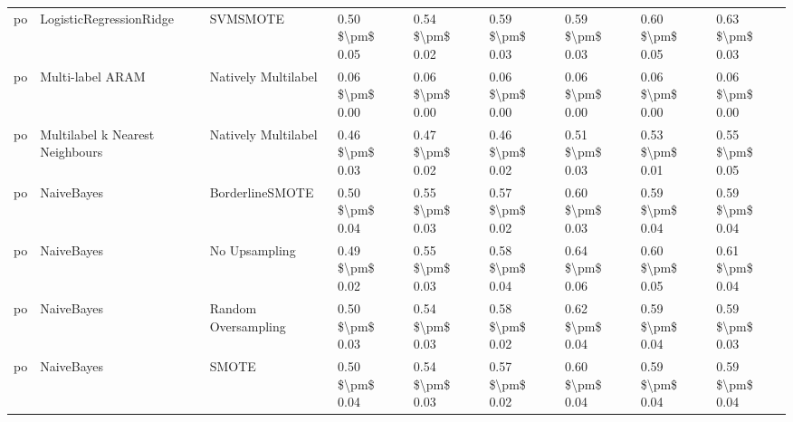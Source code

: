 \begin{tabular}{lllllllll}
      po &         LogisticRegressionRidge &                      SVMSMOTE & 0.50 \$\textbackslash pm\$ 0.05 &           0.54 \$\textbackslash pm\$ 0.02 &       0.59 \$\textbackslash pm\$ 0.03 &        0.59 \$\textbackslash pm\$ 0.03 &                         0.60 \$\textbackslash pm\$ 0.05 &     0.63 \$\textbackslash pm\$ 0.03 \\
      po &                Multi-label ARAM &           Natively Multilabel & 0.06 \$\textbackslash pm\$ 0.00 &           0.06 \$\textbackslash pm\$ 0.00 &       0.06 \$\textbackslash pm\$ 0.00 &        0.06 \$\textbackslash pm\$ 0.00 &                         0.06 \$\textbackslash pm\$ 0.00 &     0.06 \$\textbackslash pm\$ 0.00 \\
      po & Multilabel k Nearest Neighbours &           Natively Multilabel & 0.46 \$\textbackslash pm\$ 0.03 &           0.47 \$\textbackslash pm\$ 0.02 &       0.46 \$\textbackslash pm\$ 0.02 &        0.51 \$\textbackslash pm\$ 0.03 &                         0.53 \$\textbackslash pm\$ 0.01 &     0.55 \$\textbackslash pm\$ 0.05 \\
      po &                      NaiveBayes &               BorderlineSMOTE & 0.50 \$\textbackslash pm\$ 0.04 &           0.55 \$\textbackslash pm\$ 0.03 &       0.57 \$\textbackslash pm\$ 0.02 &        0.60 \$\textbackslash pm\$ 0.03 &                         0.59 \$\textbackslash pm\$ 0.04 &     0.59 \$\textbackslash pm\$ 0.04 \\
      po &                      NaiveBayes &                 No Upsampling & 0.49 \$\textbackslash pm\$ 0.02 &           0.55 \$\textbackslash pm\$ 0.03 &       0.58 \$\textbackslash pm\$ 0.04 &        0.64 \$\textbackslash pm\$ 0.06 &                         0.60 \$\textbackslash pm\$ 0.05 &     0.61 \$\textbackslash pm\$ 0.04 \\
      po &                      NaiveBayes &           Random Oversampling & 0.50 \$\textbackslash pm\$ 0.03 &           0.54 \$\textbackslash pm\$ 0.03 &       0.58 \$\textbackslash pm\$ 0.02 &        0.62 \$\textbackslash pm\$ 0.04 &                         0.59 \$\textbackslash pm\$ 0.04 &     0.59 \$\textbackslash pm\$ 0.03 \\
      po &                      NaiveBayes &                         SMOTE & 0.50 \$\textbackslash pm\$ 0.04 &           0.54 \$\textbackslash pm\$ 0.03 &       0.57 \$\textbackslash pm\$ 0.02 &        0.60 \$\textbackslash pm\$ 0.04 &                         0.59 \$\textbackslash pm\$ 0.04 &     0.59 \$\textbackslash pm\$ 0.04 \\

\end{tabular}
